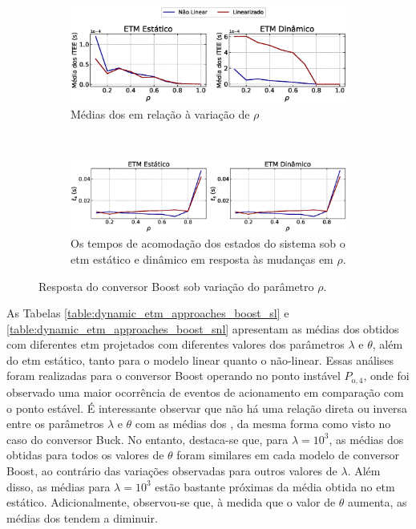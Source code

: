\begin{figure}[H]
  \centering
  \captionsetup{justification=centering}
  \begin{subfigure}{1.\textwidth}
    \centering
    \includegraphics[width=1.\textwidth]{figuras/boost/itee-mean.eps}
    \caption{Médias dos  em relação à variação de $\rho$}
  \end{subfigure}
  \\[6pt]
  \begin{subfigure}{1.\textwidth} 
    \centering
    \includegraphics[width=1.\textwidth]{figuras/boost/ts.eps}
    \caption{Os tempos de acomodação dos estados do sistema sob o \acrshort{etm} estático e dinâmico em resposta às mudanças em $\rho$.}
  \end{subfigure}
  \caption{Resposta do conversor Boost sob variação do parâmetro $\rho$.}
  \label{fig:boost_converter_mu}
\end{figure}

As Tabelas \ref{table:dynamic_etm_approaches_boost_sl} e \ref{table:dynamic_etm_approaches_boost_snl} apresentam as médias dos  obtidos com diferentes \acrshort{etm} projetados com diferentes valores dos parâmetros $\lambda$ e $\theta$, além do \acrshort{etm} estático, tanto para o modelo linear quanto o não-linear. Essas análises foram realizadas para o conversor Boost operando no ponto instável $P_{\mathrm{o}, 4}$, onde foi observado uma maior ocorrência de eventos de acionamento em comparação com o ponto estável. É interessante observar que não há uma relação direta ou inversa entre os parâmetros $\lambda$ e $\theta$ com as médias dos , da mesma forma como visto no caso do conversor Buck. No entanto, destaca-se que, para $\lambda = 10^3$, as médias dos  obtidas para todos os valores de $\theta$ foram similares em cada modelo de conversor Boost, ao contrário das variações observadas para outros valores de $\lambda$. Além disso, as médias para $\lambda = 10^3$ estão bastante próximas da média obtida no \acrshort{etm} estático. Adicionalmente, observou-se que, à medida que o valor de $\theta$ aumenta, as médias dos  tendem a diminuir.

